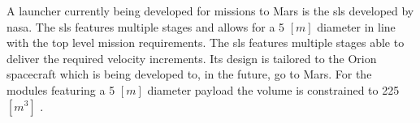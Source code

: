 A launcher currently being developed for missions to Mars is the \gls{sls} developed by \gls{nasa}. The \gls{sls} features multiple stages and allows for a 5 $[m]$ diameter in line with the top level mission requirements. The \gls{sls} features multiple stages able to deliver the required velocity increments. Its design is tailored to the Orion spacecraft which is being developed to, in the future, go to Mars. For the modules featuring a 5 $[m]$ diameter payload the volume is constrained to 225 $[m^3]$ \cite{NASA2014}.


